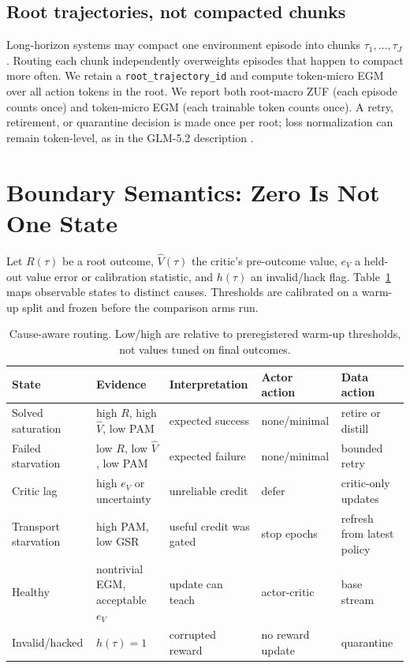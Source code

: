 \documentclass{article}
\begin{document}
\subsection{Root trajectories, not compacted chunks}

Long-horizon systems may compact one environment episode into chunks
$\tau_1,\ldots,\tau_J$.  Routing each chunk independently overweights episodes
that happen to compact more often.  We retain a \texttt{root\_trajectory\_id}
and compute token-micro EGM over all action tokens in the root.  We report both
root-macro ZUF (each episode counts once) and token-micro EGM (each trainable
token counts once).  A retry, retirement, or quarantine decision is made once
per root; loss normalization can remain token-level, as in the GLM-5.2
description \citep{glm2026glm52}.

\section{Boundary Semantics: Zero Is Not One State}
\label{sec:semantics}

Let $R(\tau)$ be a root outcome, $\hat V(\tau)$ the critic's pre-outcome value,
$e_V$ a held-out value error or calibration statistic, and $h(\tau)$ an
invalid/hack flag.  Table~\ref{tab:states} maps observable states to distinct
causes.  Thresholds are calibrated on a warm-up split and frozen before the
comparison arms run.

\begin{table}[t]
\centering
\caption{Cause-aware routing.  Low/high are relative to preregistered
warm-up thresholds, not values tuned on final outcomes.}
\label{tab:states}
\small
\begin{tabularx}{\linewidth}{@{}lXXXX@{}}
\toprule
State & Evidence & Interpretation & Actor action & Data action \\
\midrule
Solved saturation & high $R$, high $\hat V$, low PAM & expected success & none/minimal & retire or distill \\
Failed starvation & low $R$, low $\hat V$, low PAM & expected failure & none/minimal & bounded retry \\
Critic lag & high $e_V$ or uncertainty & unreliable credit & defer & critic-only updates \\
Transport starvation & high PAM, low GSR & useful credit was gated & stop epochs & refresh from latest policy \\
Healthy & nontrivial EGM, acceptable $e_V$ & update can teach & actor-critic & base stream \\
Invalid/hacked & $h(\tau)=1$ & corrupted reward & no reward update & quarantine \\
\bottomrule
\end{tabularx}
\end{table}
\end{document}
